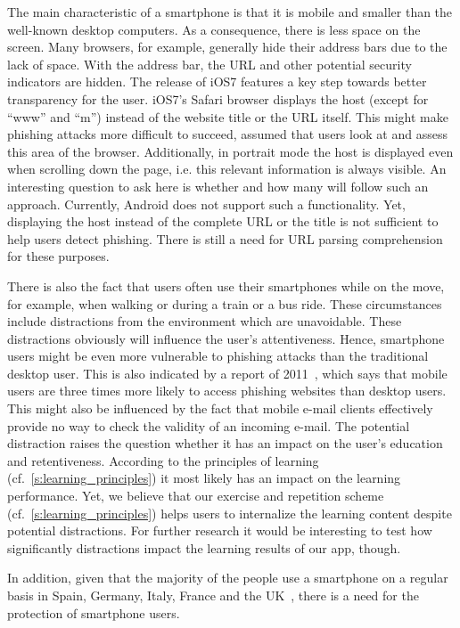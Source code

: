 \begin{description}[leftmargin=0cm]
	\item[Mobility and Size:] The main characteristic of a smartphone is that it is mobile and smaller than the well-known desktop computers.
 As a consequence, there is less space on the screen.
 Many browsers, for example, generally hide their address bars due to the lack of space.
 With the address bar, the URL and other potential security indicators are hidden.
The release of iOS7 features a key step towards better transparency for the user.
iOS7's Safari browser displays the host (except for ``www'' and ``m'') instead of the website title or the URL itself.
This might make phishing attacks more difficult to succeed, assumed that users look at and assess this area of the browser.
Additionally, in portrait mode the host is displayed even when scrolling down the page, i.e. this relevant information is always visible.
An interesting question to ask here is whether and how many will follow such an approach.
Currently, Android does not support such a functionality. 
Yet, displaying the host instead of the complete URL or the title is not sufficient to help users detect phishing.
There is still a need for URL parsing comprehension for these purposes.
	\item[Distraction Caused by Mobility:] There is also the fact that users often use their smartphones while on the move, for example, when walking or  during a train or a bus ride.
 These circumstances include distractions from the environment which are unavoidable.
 These distractions obviously will influence the user's attentiveness.
 Hence, smartphone users might be even more vulnerable to phishing attacks than the traditional desktop user.
 This is also indicated by a report of 2011~\cite{trusteer2011}, which says that mobile users are three times more likely to access phishing websites than desktop users.
 This might also be influenced by the fact that mobile e-mail clients effectively provide no way to check the validity of an incoming e-mail.
The potential distraction raises the question whether it has an impact on the user's education and retentiveness.
According to the principles of learning (cf.~\autoref{s:learning_principles}) it most likely has an impact on the learning performance.
Yet, we believe that our exercise and repetition scheme (cf.~\autoref{s:learning_principles}) helps users to internalize the learning content despite potential distractions.
For further research it would be interesting to test how significantly distractions impact the learning results of our app, though.
	\item[High Number of Smartphone Users:] In addition, given that the majority of the people use a smartphone on a regular basis in Spain, Germany, Italy, France and the UK~\cite{smartphoneusage}, there is a need for the protection of smartphone users.
\end{description} 

